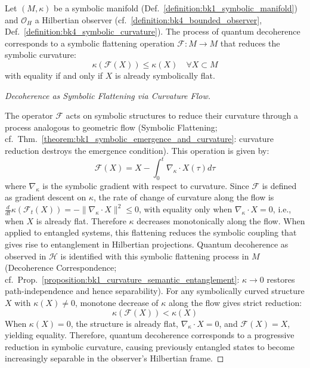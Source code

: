\begin{proposition}
\label{proposition:bk8_operator_curvature_flux}
Let $(M, \kappa)$ be a symbolic manifold (Def.~\ref{definition:bk1_symbolic_manifold}) and $\mathcal{O}_H$ a Hilbertian observer (cf.~\ref{definition:bk4_bounded_observer}, Def.~\ref{definition:bk4_symbolic_curvature}). The process of quantum decoherence corresponds to a symbolic flattening operation $\mathcal{F}: M \to M$ that reduces the symbolic curvature:
\[
\kappa(\mathcal{F}(X)) \leq \kappa(X) \quad \forall X \subset M
\]
with equality if and only if $X$ is already symbolically flat.
\end{proposition}
\begin{proof}[Decoherence as Symbolic Flattening via Curvature Flow]
\label{proof:bk8_flattening_decoherence_equivalence}
\leavevmode

The operator $\mathcal{F}$ acts on symbolic structures to reduce their curvature through a process analogous to geometric flow (Symbolic Flattening; cf.~Thm.~\ref{theorem:bk1_symbolic_emergence_and_curvature}: curvature reduction destroys the emergence condition). This operation is given by:
\begin{equation}
\mathcal{F}(X) = X - \int_0^t \nabla_{\kappa} \cdot X(\tau) d\tau
\end{equation}
where $\nabla_{\kappa}$ is the symbolic gradient with respect to curvature.
Since $\mathcal{F}$ is defined as gradient descent on $\kappa$, the rate of change of curvature along the flow is $\frac{d}{dt}\kappa(\mathcal{F}_t(X)) = -\|\nabla_\kappa \cdot X\|^2 \leq 0$, with equality only when $\nabla_\kappa \cdot X = 0$, i.e., when $X$ is already flat. Therefore $\kappa$ decreases monotonically along the flow.
When applied to entangled systems, this flattening reduces the symbolic coupling that gives rise to entanglement in Hilbertian projections. Quantum decoherence as observed in $\mathcal{H}$ is identified with this symbolic flattening process in $M$ (Decoherence Correspondence; cf.~Prop.~\ref{proposition:bk1_curvature_semantic_entanglement}: $\kappa \to 0$ restores path-independence and hence separability).
For any symbolically curved structure $X$ with $\kappa(X) \neq 0$, monotone decrease of $\kappa$ along the flow gives strict reduction:
\begin{equation}
\kappa(\mathcal{F}(X)) < \kappa(X)
\end{equation}
When $\kappa(X) = 0$, the structure is already flat, $\nabla_\kappa \cdot X = 0$, and $\mathcal{F}(X) = X$, yielding equality.
Therefore, quantum decoherence corresponds to a progressive reduction in symbolic curvature, causing previously entangled states to become increasingly separable in the observer's Hilbertian frame.
\end{proof}
